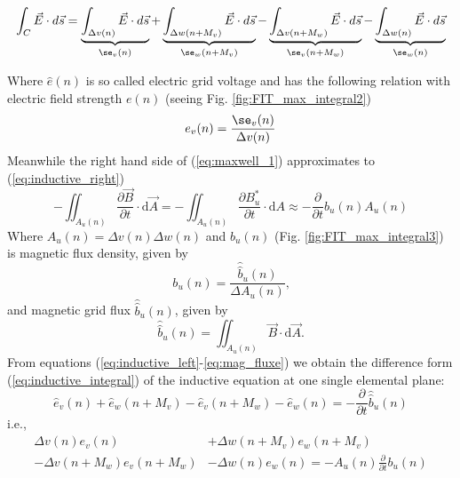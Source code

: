 \begin{equation}
\int_{C}\vec{E}\cdot d\vec{s}
=\underbrace{\int_{\Delta v(n)}\vec{E}\cdot d\vec{s}}_{\se_{v}(n)}
+\underbrace{\int_{\Delta w(n+M_{v})}\vec{E}\cdot d\vec{s}}_{\se_{w}(n+M_{v})}
-\underbrace{\int_{\Delta v(n+M_{w})}\vec{E}\cdot d\vec{s}}_{\se_{v}(n+M_{w})}
-\underbrace{\int_{\Delta w(n)}\vec{E}\cdot d\vec{s}}_{\se_{w}(n)}
\label{eq:inductive_left}
\end{equation}

Where $\widehat{e}(n)$ is so called  electric grid voltage and has the following relation with electric field strength $e(n)$ (seeing Fig. \ref{fig:FIT_max_integral2})
\begin{equation}
 e_{v}(n)=\frac{\se_{v}(n)}{\Delta v(n)}
\label{eq:e_field}
\end{equation}
Meanwhile the right hand side of (\ref{eq:maxwell_1}) approximates to (\ref{eq:inductive_right})
\begin{equation}
-\iint_{A_{u}(n)}\frac{\partial\vec{B}}{\partial t}\cdot\mathrm{d}\vec{A} 
=-\iint_{A_{u}(n)}\frac{\partial B^{*}_{u}}{\partial t}\cdot\mathrm{d}A
\approx -\frac{\partial}{\partial t}b_{u}(n)A_{u}(n)
\label{eq:inductive_right}
\end{equation}
Where $A_{u}(n)=\Delta v(n)\Delta w(n)$ and $b_{u}(n)$ (Fig. \ref{fig:FIT_max_integral3}) is magnetic flux density, given by
\begin{equation}
 b_{u}(n)=\frac{\widehat{\widehat{b}}_{u}(n)}{\Delta A_{u}(n)} \text{,}
\label{eq:b_flux_density}
\end{equation}
 and magnetic grid flux $\widehat{\widehat{b}}_{u}(n)$, given by
\begin{equation}
\widehat{\widehat{b}}_{u}(n)=\iint_{A_{u}(n)}\vec{B}\cdot\mathrm{d}\vec{A} \text{.}
\label{eq:mag_fluxe}
\end{equation}
From equations (\ref{eq:inductive_left}-\ref{eq:mag_fluxe}) we obtain the difference form (\ref{eq:inductive_integral}) of the inductive equation at one single elemental plane:
\begin{equation}
\widehat{e}_{v}(n)+\widehat{e}_{w}(n+M_{v})-\widehat{e}_{v}(n+M_{w})-\widehat{e}_{w}(n)=-\frac{\partial}{\partial t}\widehat{\widehat{b}}_{u}(n)
\label{eq:inductive_integral}
\end{equation}
i.e.,
\begin{align}
\Delta v(n)e_{v}(n)&+\Delta w(n+M_{v})e_{w}(n+M_{v})\nonumber\\
-\Delta v(n+M_{w})e_{v}(n+M_{w})&-\Delta w(n)e_{w}(n)=-A_{u}(n)\frac{\partial}{\partial{t}}b_{u}(n) 
\label{eq:inductive_sample}
\end{align}
